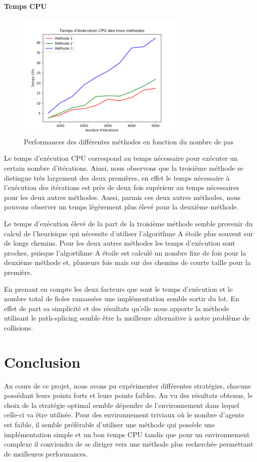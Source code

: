 \documentclass[a4paper, twocolumn]{article}
\begin{document}
		\subsection{Temps CPU}
		
		\begin{figure}[h!]
			\includegraphics[width=3.2in]{CPU_time.png}
			\caption{\textsf{Performances des différentes méthodes en fonction du nombre de pas}}
			\label{fig_sim}
		\end{figure}
	
		Le temps d'exécution CPU correspond au temps nécessaire pour exécuter un certain nombre d'itérations. Ainsi, nous observons que la troisième méthode se distingue très largement des deux premières, en effet le temps nécessaire à l'exécution des itérations est près de deux fois supérieur au temps nécessaires pour les deux autres méthodes. Aussi, parmis ces deux autres méthodes, nous pouvons observer un temps légèrement plus élevé pour la deuxième méthode.
		
		Le temps d'exécution élevé de la part de la troisième méthode semble provenir du calcul de l'heurisique qui nécessite d'utiliser l'algorithme A étoile plus souvent sur de longs chemins.
		Pour les deux autres méthodes les temps d'exécution sont proches, puisque l'algortihme A étoile est calculé un nombre fixe de fois pour la deuxième méthode et, plusieurs fois mais sur des chemins de courte taille pour la première.
	 
	 	En prenant en compte les deux facteurs que sont le temps d'exécution et le nombre total de fioles ramassées une implémentation semble sortir du lot. En effet de part sa simplicité et des résultats qu'elle nous apporte la méthode utilisant le path-splicing semble être la meilleure alternative à notre problème de collisions.
		
	\part{Conclusion}
	Au cours de ce projet, nous avons pu expérimenter différentes stratégies, chacune possédant leurs points forts et leurs points faibles. Au vu des résultats obtenus, le choix de la stratégie optimal semble dépendre de l'environnement dans lequel celle-ci va être utilisée. Pour des environnement triviaux où le nombre d'agents est faible, il semble préférable d'utiliser une méthode qui possède une implémentation simple et un bon temps CPU tandis que pour un environnement complexe il conviendra de se diriger vers une méthode plus recherchée permettant de meilleures performances.
\end{document}
